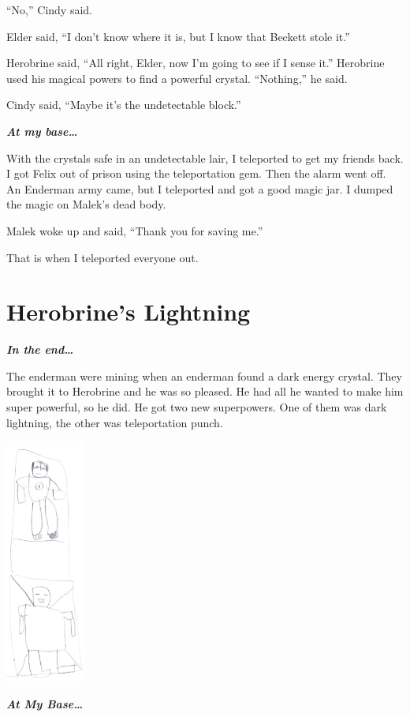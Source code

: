 \documentclass[oneside]{book}
\begin{document}
``No,'' Cindy said.

Elder said, ``I don't know where it is, but I know that Beckett stole
it.''

Herobrine said, ``All right, Elder, now I'm going to see if I sense
it.'' Herobrine used his magical powers to find a powerful crystal.
``Nothing,'' he said.

Cindy said, ``Maybe it's the undetectable block.''

\textbf{\emph{At my base\ldots{}}}

With the crystals safe in an undetectable lair, I teleported to get my
friends back. I got Felix out of prison using the teleportation gem.
Then the alarm went off. An Enderman army came, but I teleported and got
a good magic jar. I dumped the magic on Malek's dead body.

Malek woke up and said, ``Thank you for saving me.''

That is when I teleported everyone out.

\chapter{Herobrine's Lightning}\label{herobrines-lightning}

\textbf{\emph{In the end\ldots{}}}

The enderman were mining when an enderman found a dark energy crystal.
They brought it to Herobrine and he was so pleased. He had all he wanted
to make him super powerful, so he did. He got two new superpowers. One
of them was dark lightning, the other was teleportation punch.

\includegraphics[width=1.04167in]{img/dark-lightning.jpg}

\textbf{\emph{At My Base\ldots{}}}
\end{document}
